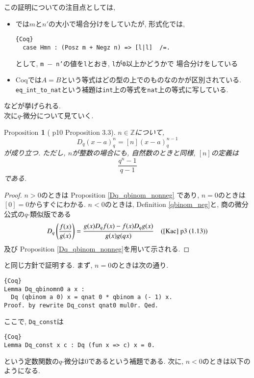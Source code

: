 \documentclass[11pt]{jsreport}
\theoremstyle{mystyle}
\newtheorem{prop}[df]{$\textrm{Proposition}$}
\newcommand{\bprop}{\begin{shadebox} \begin{prop}}
\newcommand{\eprop}{\end{prop} \end{shadebox}}
\newcommand{\bpf}{\begin{proof}}
\newcommand{\epf}{\end{proof}}
\newcommand{\Z}{\mathbb{Z}}
\newcommand{\0}{\textbf{0}}
\newcommand{\1}{\textbf{1}}
\newcommand{\2}{\textbf{2}}
\begin{document}
この証明についての注目点としては, 
\begin{itemize}
  \item \cite{Kac}では$m$と$n'$の大小で場合分けをしていたが, 形式化では, 
           \begin{lstlisting}{Coq}
  case Hmn : (Posz m + Negz n) => [l|l]  /=. \end{lstlisting}
           として, {\tt m $-$ n'}の値を{\tt l}とおき, {\tt l}が{\tt 0}以上かどうかで
           場合分けをしている
  \item Coqでは$A = B$という等式はどの型の上でのものなのかが区別されている. 
           {\tt eq\_int\_to\_nat}という補題は{\tt int}上の等式を{\tt nat}上の等式に写している. 
\end{itemize}
などが挙げられる. \\
次に$q$-微分について見ていく.  
\bprop[\cite{Kac} p10 Proposition 3.3]
  $n \in \Z$について, 
  \[
    D_q (x - a)^n_q = [n] (x - a)^{n - 1}_q
  \]
  が成り立つ. ただし, $n$が整数の場合にも, 自然数のときと同様, $[n]$の定義は
  \[
    \frac{q^n - 1}{q - 1}
  \]
  である. 
\eprop
\bpf
  $n > 0$のときは Proposition \ref{Dq_qbinom_nonneg} であり, $n = 0$のときは$[0] = 0$からすぐにわかる. 
  $n < 0$のときは, Definition \ref{qbinom_neg}と, 商の微分公式の$q$-類似版である
  \[
    D_q \left( \frac{f(x)}{g(x)} \right) = \frac{g(x) D_q f(x) - f(x) D_q g(x)}{g(x) g(qx)} \quad
    \text{(\cite{Kac} p3 (1.13))}
  \]
  及び Proposition \ref{Dq_qbinom_nonneg}を用いて示される. 
\epf
\cite{Kac}と同じ方針で証明する. まず, $n = 0$のときは次の通り. 
\begin{lstlisting}{Coq}
Lemma Dq_qbinomn0 a x :
  Dq (qbinom a 0) x = qnat 0 * qbinom a (- 1) x.
Proof. by rewrite Dq_const qnat0 mul0r. Qed. \end{lstlisting}
ここで, {\tt Dq\_const}は
\begin{lstlisting}{Coq}
Lemma Dq_const x c : Dq (fun x => c) x = 0. \end{lstlisting}
という定数関数の$q$-微分は$0$であるという補題である. 次に, $n < 0$のときは以下のようになる. 
\end{document}
